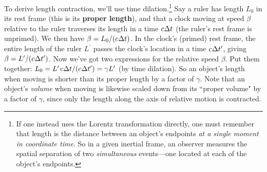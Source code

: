 \documentclass[12pt]{article}
\begin{document}
To derive length contraction, we'll use time dilation.\footnote{If one instead uses the Lorentz transformation directly, one must remember that length is the distance between an object's endpoints \emph{at a single moment in coordinate time}. So in a given inertial frame, an observer measures the spatial separation of two \emph{simultaneous} events---one located at each of the object's endpoints.} Say a ruler has length $L_0$ in its rest frame (this is its \textbf{proper length}), and that a clock moving at speed $\beta$ relative to the ruler traverses its length in a time $c \mkern.5mu \Delta t$ (the ruler's rest frame is unprimed). We then have $\beta = L_0 / (c \mkern.5mu \Delta t)$. In the clock's (primed) rest frame, the entire length of the ruler $L^\prime$ passes the clock's location in a time $c \mkern.5mu \Delta t^\prime$, giving $\beta = L^\prime / (c \mkern.5mu \Delta t^\prime)$. Now we've got two expressions for the relative speed $\beta$. Put them together: $L_0 = L^\prime \mkern2mu c \mkern.5mu \Delta t / (c \mkern.5mu \Delta t^\prime) = \gamma L^\prime$ (by time dilation). So an object's length when moving is shorter than its proper length by a factor of $\gamma$. Note that an object's \emph{volume} when moving is likewise scaled down from its ``proper volume" by a factor of $\gamma$, since only the length along the axis of relative motion is contracted.
\end{document}
